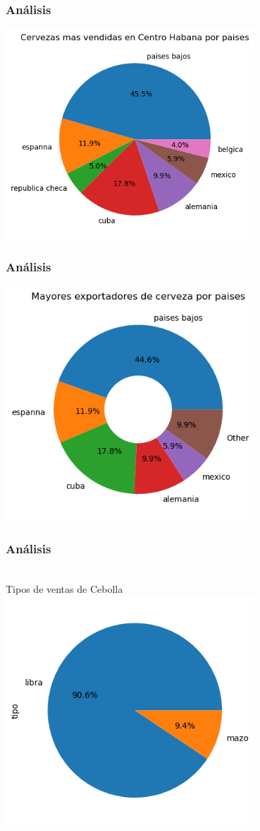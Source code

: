 \documentclass{beamer}
\begin{document}
\newpage
\begin{frame}
\frametitle{Análisis}
\includegraphics[width=0.7\textwidth]{Cerv_mas_vendida_por_pais.png}
\end{frame}

\newpage
\begin{frame}
\frametitle{Análisis}
\includegraphics[width=0.7\textwidth]{Cerv_mayor_exportador.png}
\end{frame}

\newpage
\begin{frame}
\frametitle{Análisis}\\Tipos de ventas de Cebolla
\includegraphics[width=0.7\textwidth]{Ceb_tipos_de_ventas.png}
\end{frame}
\end{document}
